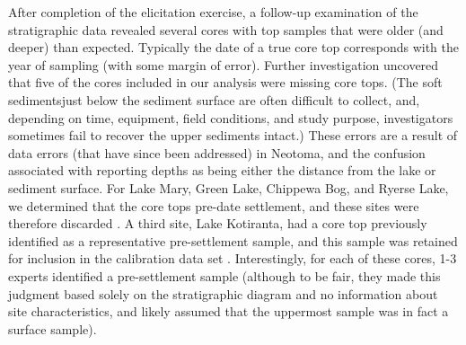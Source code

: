 \documentclass[12pt]{article}
\begin{document}
After completion of the elicitation exercise, a follow-up examination
of the stratigraphic data revealed several cores with top samples that
were older (and deeper) than expected. Typically the date of a true
core top corresponds with the year of sampling (with some margin of
error). Further investigation uncovered that five of the cores
included in our analysis were missing core tops. (The soft
sedimentsjust below the sediment surface are often difficult to
collect, and, depending on time, equipment, field conditions, and
study purpose, investigators sometimes fail to recover the upper
sediments intact.) These errors are a result of data errors (that have
since been addressed) in Neotoma, and the confusion associated with
reporting depths as being either the distance from the lake or
sediment surface. For Lake Mary, Green Lake, Chippewa Bog, and Ryerse
Lake, we determined that the core tops pre-date settlement, and these
sites were therefore discarded \citep{webb1971late, lawrenz1975}. A
third site, Lake Kotiranta, had a core top previously identified as a
representative pre-settlement sample, and this sample was retained for
inclusion in the calibration data set
\citep{wright1969}. Interestingly, for each of these cores, 1-3
experts identified a pre-settlement sample (although to be fair, they
made this judgment based solely on the stratigraphic diagram and no
information about site characteristics, and likely assumed that the
uppermost sample was in fact a surface sample).

\end{document}
